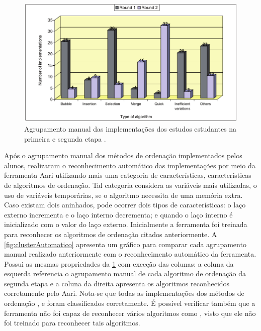 		\begin{figure}[h]
			\centering
			\includegraphics[scale=0.4]{imagem/clusterManual.png}
			\caption[Agrupamento manual das implementações dos estudos estudantes na
			primeira e segunda etapa]{Agrupamento manual das implementações dos estudos estudantes na
			primeira e segunda etapa \cite{Taherkhani:2012}.}
			\label{fig:clusterManual}
		\end{figure}
		
		Após o agrupamento manual dos métodos de ordenação implementados pelos alunos,
		 realizaram o reconhecimento automático das
		implementações por meio da ferramenta Aari utilizando mais uma categoria de
		características, características de algoritmos de ordenação. Tal categoria
		considera as variáveis mais utilizadas, o uso de variáveis temporárias, se o
		algoritmo necessita de uma memória extra. Caso existam dois 
		aninhados, pode ocorrer dois tipos de características: o laço externo incrementa
		e o laço interno decrementa; e quando o laço interno é inicializado com o valor
		do laço externo. Inicialmente a ferramenta foi treinada para reconhecer os
		algoritmos de ordenação citados anteriormente. A \cref{fig:clusterAutomatico}
		apresenta um gráfico para comparar cada agrupamento manual realizado anteriormente
		com o reconhecimento automático da ferramenta. Possui as mesmas propriedades da
		\cref{fig:clusterManual} com exceção das colunas: a coluna da esquerda referencia
		o agrupamento manual de cada algoritmo de ordenação da segunda etapa e a coluna
		da direita apresenta os algoritmos reconhecidos corretamente pelo Aari. Nota-se
		que todas as implementações dos métodos de ordenação ,
		 e  foram classificados corretamente.
		É possível verificar também que a ferramenta não foi capaz de reconhecer vários
		algoritmos como , visto que ele não foi treinado para
		reconhecer tais algoritmos.
		
